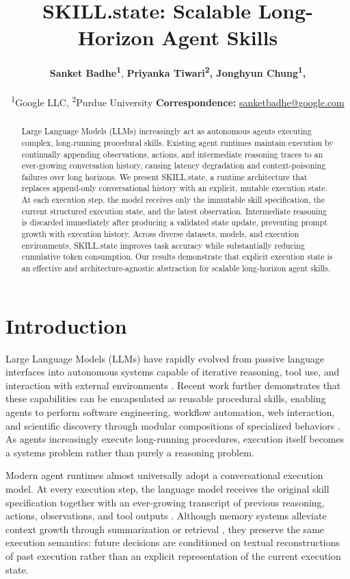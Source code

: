 \documentclass[11pt]{article}
\title{SKILL.state: Scalable Long-Horizon Agent Skills}
\author{
 \textbf{Sanket Badhe\textsuperscript{1}},
 \textbf{Priyanka Tiwari\textsuperscript{2},
  \textbf{Jonghyun Chung\textsuperscript{1}},}
\\
\\
 \textsuperscript{1}Google LLC,
 \textsuperscript{2}Purdue University
    \textbf{Correspondence:} \href{mailto:sanketbadhe@google.com}{sanketbadhe@google.com}
}
\begin{document}
\maketitle
\begin{abstract}
Large Language Models (LLMs) increasingly act as autonomous agents executing complex, long-running procedural skills. Existing agent runtimes maintain execution by continually appending observations, actions, and intermediate reasoning traces to an ever-growing conversation history, causing latency degradation and context-poisoning failures over long horizons. We present SKILL.state, a runtime architecture that replaces append-only conversational history with an explicit, mutable execution state. At each execution step, the model receives only the immutable skill specification, the current structured execution state, and the latest observation. Intermediate reasoning is discarded immediately after producing a validated state update, preventing prompt growth with execution history. Across diverse datasets, models, and execution environments, SKILL.state improves task accuracy while substantially reducing cumulative token consumption. Our results demonstrate that explicit execution state is an effective and architecture-agnostic abstraction for scalable long-horizon agent skills.
\end{abstract}

\section{Introduction}
\label{sec:intro}

Large Language Models (LLMs) have rapidly evolved from passive language interfaces into autonomous systems capable of iterative reasoning, tool use, and interaction with external environments \citep{yao2022react, schick2023toolformer, qin2023toolllm, wu2023autogen}. Recent work further demonstrates that these capabilities can be encapsulated as reusable procedural skills, enabling agents to perform software engineering, workflow automation, web interaction, and scientific discovery through modular compositions of specialized behaviors \citep{badhe2026systematic}. As agents increasingly execute long-running procedures, execution itself becomes a systems problem rather than purely a reasoning problem.

Modern agent runtimes almost universally adopt a conversational execution model. At every execution step, the language model receives the original skill specification together with an ever-growing transcript of previous reasoning, actions, observations, and tool outputs \citep{yao2022react, mialon2023augmented}. Although memory systems alleviate context growth through summarization or retrieval \citep{packer2023memgpt, xu2023longllmem, zhong2023memorybank}, they preserve the same execution semantics: future decisions are conditioned on textual reconstructions of past execution rather than an explicit representation of the current execution state.
\end{document}

